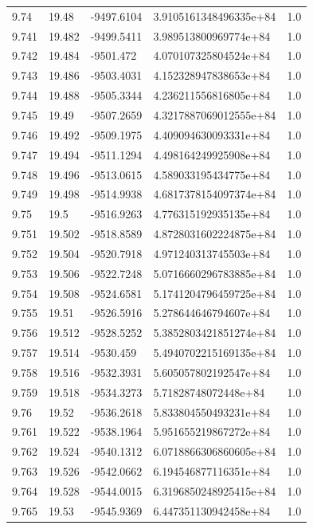 \begin{tabular}{lllll}
9.74 & 19.48 & -9497.6104 & 3.9105161348496335e+84 & 1.0 \\
9.741 & 19.482 & -9499.5411 & 3.989513800969774e+84 & 1.0 \\
9.742 & 19.484 & -9501.472 & 4.070107325804524e+84 & 1.0 \\
9.743 & 19.486 & -9503.4031 & 4.152328947838653e+84 & 1.0 \\
9.744 & 19.488 & -9505.3344 & 4.236211556816805e+84 & 1.0 \\
9.745 & 19.49 & -9507.2659 & 4.3217887069012555e+84 & 1.0 \\
9.746 & 19.492 & -9509.1975 & 4.409094630093331e+84 & 1.0 \\
9.747 & 19.494 & -9511.1294 & 4.498164249925908e+84 & 1.0 \\
9.748 & 19.496 & -9513.0615 & 4.589033195434775e+84 & 1.0 \\
9.749 & 19.498 & -9514.9938 & 4.6817378154097374e+84 & 1.0 \\
9.75 & 19.5 & -9516.9263 & 4.776315192935135e+84 & 1.0 \\
9.751 & 19.502 & -9518.8589 & 4.8728031602224875e+84 & 1.0 \\
9.752 & 19.504 & -9520.7918 & 4.971240313745503e+84 & 1.0 \\
9.753 & 19.506 & -9522.7248 & 5.0716660296783885e+84 & 1.0 \\
9.754 & 19.508 & -9524.6581 & 5.1741204796459725e+84 & 1.0 \\
9.755 & 19.51 & -9526.5916 & 5.278644646794607e+84 & 1.0 \\
9.756 & 19.512 & -9528.5252 & 5.3852803421851274e+84 & 1.0 \\
9.757 & 19.514 & -9530.459 & 5.4940702215169135e+84 & 1.0 \\
9.758 & 19.516 & -9532.3931 & 5.605057802192547e+84 & 1.0 \\
9.759 & 19.518 & -9534.3273 & 5.71828748072448e+84 & 1.0 \\
9.76 & 19.52 & -9536.2618 & 5.833804550493231e+84 & 1.0 \\
9.761 & 19.522 & -9538.1964 & 5.951655219867272e+84 & 1.0 \\
9.762 & 19.524 & -9540.1312 & 6.0718866306860605e+84 & 1.0 \\
9.763 & 19.526 & -9542.0662 & 6.194546877116351e+84 & 1.0 \\
9.764 & 19.528 & -9544.0015 & 6.3196850248925415e+84 & 1.0 \\
9.765 & 19.53 & -9545.9369 & 6.447351130942458e+84 & 1.0 \\

\end{tabular}
